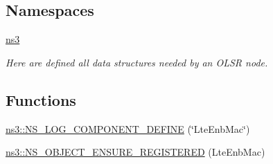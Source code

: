 \subsection*{Namespaces}
\begin{DoxyCompactItemize}
\item 
 \hyperlink{namespacens3}{ns3}
\begin{DoxyCompactList}\small\item\em Here are defined all data structures needed by an O\+L\+SR node. \end{DoxyCompactList}\end{DoxyCompactItemize}
\subsection*{Functions}
\begin{DoxyCompactItemize}
\item 
\hyperlink{namespacens3_a5d0eb6b1987964cdfe8b23d8db89d436}{ns3\+::\+N\+S\+\_\+\+L\+O\+G\+\_\+\+C\+O\+M\+P\+O\+N\+E\+N\+T\+\_\+\+D\+E\+F\+I\+NE} (\char`\"{}Lte\+Enb\+Mac\char`\"{})
\item 
\hyperlink{namespacens3_a35bf08827388ecd4fe571ba5f4176940}{ns3\+::\+N\+S\+\_\+\+O\+B\+J\+E\+C\+T\+\_\+\+E\+N\+S\+U\+R\+E\+\_\+\+R\+E\+G\+I\+S\+T\+E\+R\+ED} (Lte\+Enb\+Mac)
\end{DoxyCompactItemize}
